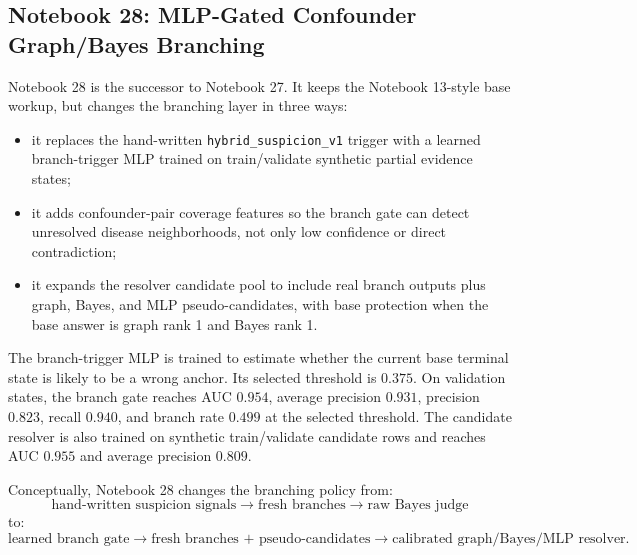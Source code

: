 \documentclass[11pt]{article}
\begin{document}
\subsection{Notebook 28: MLP-Gated Confounder Graph/Bayes Branching}

Notebook 28 is the successor to Notebook 27. It keeps the Notebook 13-style base workup, but changes the branching layer in three ways:
\begin{itemize}[leftmargin=*]
    \item it replaces the hand-written \texttt{hybrid\_suspicion\_v1} trigger with a learned branch-trigger MLP trained on train/validate synthetic partial evidence states;
    \item it adds confounder-pair coverage features so the branch gate can detect unresolved disease neighborhoods, not only low confidence or direct contradiction;
    \item it expands the resolver candidate pool to include real branch outputs plus graph, Bayes, and MLP pseudo-candidates, with base protection when the base answer is graph rank 1 and Bayes rank 1.
\end{itemize}

The branch-trigger MLP is trained to estimate whether the current base terminal state is likely to be a wrong anchor. Its selected threshold is $0.375$. On validation states, the branch gate reaches AUC $0.954$, average precision $0.931$, precision $0.823$, recall $0.940$, and branch rate $0.499$ at the selected threshold. The candidate resolver is also trained on synthetic train/validate candidate rows and reaches AUC $0.955$ and average precision $0.809$.

Conceptually, Notebook 28 changes the branching policy from:
\[
\text{hand-written suspicion signals} \rightarrow \text{fresh branches} \rightarrow \text{raw Bayes judge}
\]
to:
\[
\text{learned branch gate} \rightarrow \text{fresh branches + pseudo-candidates} \rightarrow \text{calibrated graph/Bayes/MLP resolver}.
\]
\end{document}
